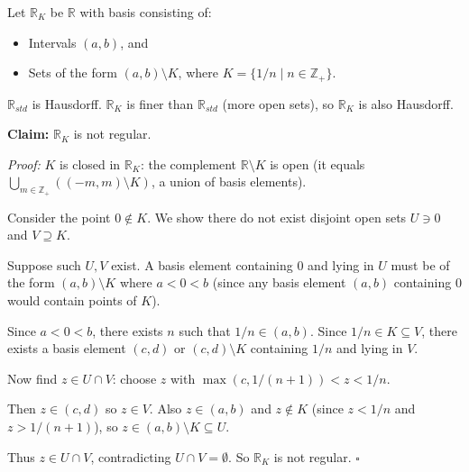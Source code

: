 \documentclass[11pt]{report}
\begin{document}
\begin{exbox}
Let $\mathbb{R}_K$ be $\mathbb{R}$ with basis consisting of:
\begin{itemize}
    \item Intervals $(a, b)$, and
    \item Sets of the form $(a, b) \setminus K$, where $K = \{1/n \mid n \in \mathbb{Z}_+\}$.
\end{itemize}

$\mathbb{R}_{std}$ is Hausdorff. $\mathbb{R}_K$ is finer than $\mathbb{R}_{std}$ (more open sets), so $\mathbb{R}_K$ is also Hausdorff.

\textbf{Claim:} $\mathbb{R}_K$ is not regular.

\textit{Proof:} $K$ is closed in $\mathbb{R}_K$: the complement $\mathbb{R} \setminus K$ is open (it equals $\bigcup_{m \in \mathbb{Z}_+} ((-m, m) \setminus K)$, a union of basis elements).

Consider the point $0 \notin K$. We show there do not exist disjoint open sets $U \ni 0$ and $V \supseteq K$.

Suppose such $U, V$ exist. A basis element containing $0$ and lying in $U$ must be of the form $(a, b) \setminus K$ where $a < 0 < b$ (since any basis element $(a,b)$ containing $0$ would contain points of $K$).

Since $a < 0 < b$, there exists $n$ such that $1/n \in (a, b)$. Since $1/n \in K \subseteq V$, there exists a basis element $(c, d)$ or $(c,d) \setminus K$ containing $1/n$ and lying in $V$.

Now find $z \in U \cap V$: choose $z$ with $\max(c, 1/(n+1)) < z < 1/n$. 

Then $z \in (c, d)$ so $z \in V$. Also $z \in (a, b)$ and $z \notin K$ (since $z < 1/n$ and $z > 1/(n+1)$), so $z \in (a,b) \setminus K \subseteq U$.

Thus $z \in U \cap V$, contradicting $U \cap V = \emptyset$. So $\mathbb{R}_K$ is not regular. $\square$
\end{exbox}
\end{document}
